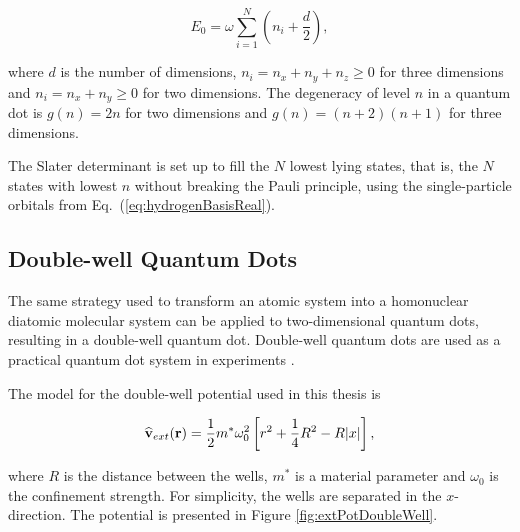 \begin{equation}
 E_0 = \omega\sum_{i=1}^N \left(n_i + \frac{d}{2}\right), \label{eq:qdotsE0}
\end{equation}

where $d$ is the number of dimensions, $n_i = n_x + n_y + n_z \ge 0$ for three dimensions and $n_i = n_x + n_y \ge 0$ for two dimensions. The degeneracy of level $n$ in a quantum dot is $g(n) = 2n$ for two dimensions and $g(n) = (n+2)(n+1)$ for three dimensions.

The Slater determinant is set up to fill the $N$ lowest lying states, that is, the $N$ states with lowest $n$ without breaking the Pauli principle, using the single-particle orbitals from Eq.~(\ref{eq:hydrogenBasisReal}).


\subsection{Double-well Quantum Dots}

The same strategy used to transform an atomic system into a homonuclear diatomic molecular system can be applied to two-dimensional quantum dots, resulting in a double-well quantum dot. Double-well quantum dots are used as a practical quantum dot system in experiments \cite{doubleWellExpt}. 

The model for the double-well potential used in this thesis is \cite{ymwang}

\begin{equation}
 {\bf\widehat{v}}_{ext}(\mathbf{r}) = \frac{1}{2}m^\ast \omega_0^2 \left[r^2 + \frac{1}{4}R^2 - R|x|\right], \label{eq:VextDoubleWell}
\end{equation}

where $R$ is the distance between the wells, $m^\ast$ is a material parameter and $\omega_0$ is the confinement strength. For simplicity, the wells are separated in the $x$-direction. The potential is presented in Figure \ref{fig:extPotDoubleWell}.

